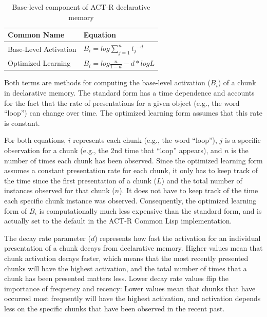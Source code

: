 \documentclass[man,floatsintext,donotrepeattitle]{apa6}
\begin{document}
\begin{table}[!ht]
  \caption{Base-level component of ACT-R declarative memory}
  \label{tabACTRBLLModel}
  {\tabulinesep=1.2mm
    \begin{tabu}{ll}
      \hline
      Common Name &  Equation \\
      \hline
      Base-Level Activation &	$B_{i} = log \sum_{j=1}^{n} {t_{j}}^{-d}$ \\
      Optimized Learning &	$B_{i} = log \frac{n}{1-d} - d * log L$ \\
      \hline
    \end{tabu}
  }
\end{table}

Both terms are methods for computing the base-level activation ($B_{i}$) of a chunk in declarative memory.
The standard form has a time dependence and accounts for the fact that the rate of presentations for a given object (e.g., the word ``loop'') can change over time.
The optimized learning form assumes that this rate is constant.

For both equations, $i$ represents each chunk (e.g., the word ``loop''), $j$ is a specific observation for a chunk (e.g., the 2nd time that ``loop'' appears), and $n$ is the number of times each chunk has been observed.
Since the optimized learning form assumes a constant presentation rate for each chunk,
it only has to keep track of the time since the first presentation of a chunk ($L$) and the total number of instances observed for that chunk ($n$). 
It does not have to keep track of the time each specific chunk instance was observed.
Consequently, the optimized learning form of $B_{i}$ is computationally much less expensive than the standard form, and is actually set to the default in the ACT-R Common Lisp implementation.

The decay rate parameter ($d$) represents how fast the activation for an individual presentation of a chunk decays from declarative memory.
Higher values mean that chunk activation decays faster, which means that the most recently presented chunks will have the highest activation, and the total number of times that a chunk has been presented matters less.
Lower decay rate values flip the importance of frequency and recency:
Lower values mean that chunks that have occurred most frequently will have the highest activation,
and activation depends less on the specific chunks that have been observed in the recent past.
\end{document}
